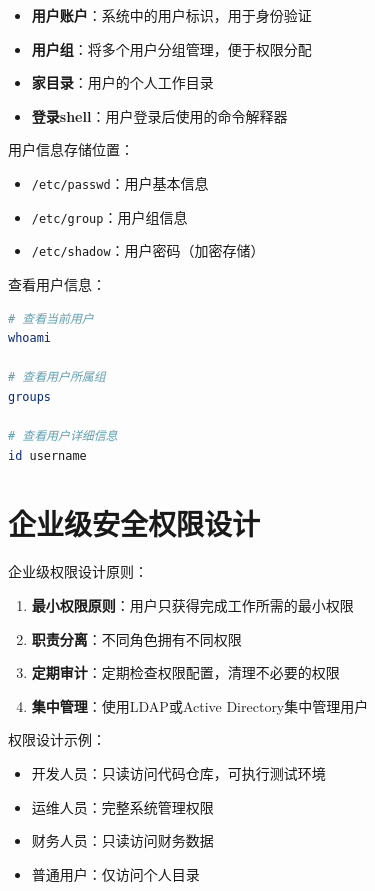 \documentclass[12pt,UTF8]{ctexbook}
\begin{document}
\begin{itemize}
    \item \textbf{用户账户}：系统中的用户标识，用于身份验证
    \item \textbf{用户组}：将多个用户分组管理，便于权限分配
    \item \textbf{家目录}：用户的个人工作目录
    \item \textbf{登录shell}：用户登录后使用的命令解释器
\end{itemize}

用户信息存储位置：
\begin{itemize}
    \item \texttt{/etc/passwd}：用户基本信息
    \item \texttt{/etc/group}：用户组信息
    \item \texttt{/etc/shadow}：用户密码（加密存储）
\end{itemize}

查看用户信息：
\begin{lstlisting}[language=bash]
# 查看当前用户
whoami

# 查看用户所属组
groups

# 查看用户详细信息
id username
\end{lstlisting}

\section{企业级安全权限设计}
\label{sec:enterprise-permission}

企业级权限设计原则：

\begin{enumerate}
    \item \textbf{最小权限原则}：用户只获得完成工作所需的最小权限
    \item \textbf{职责分离}：不同角色拥有不同权限
    \item \textbf{定期审计}：定期检查权限配置，清理不必要的权限
    \item \textbf{集中管理}：使用LDAP或Active Directory集中管理用户
\end{enumerate}

权限设计示例：
\begin{itemize}
    \item 开发人员：只读访问代码仓库，可执行测试环境
    \item 运维人员：完整系统管理权限
    \item 财务人员：只读访问财务数据
    \item 普通用户：仅访问个人目录
\end{itemize}
\end{document}

